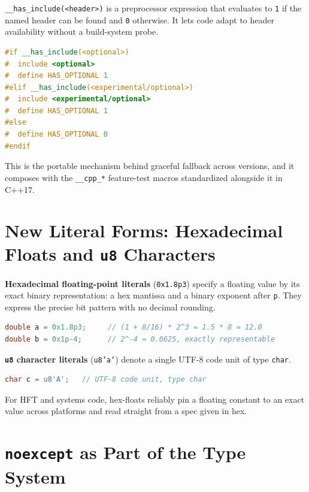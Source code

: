 \texttt{\_\_has\_include(<header>)} is a preprocessor expression that evaluates to \texttt{1} if the named header can be found and \texttt{0} otherwise. It lets code adapt to header availability without a build-system probe.

\begin{lstlisting}[language=C++,caption={Feature-detecting a header at preprocessing time}]
#if __has_include(<optional>)
#  include <optional>
#  define HAS_OPTIONAL 1
#elif __has_include(<experimental/optional>)
#  include <experimental/optional>
#  define HAS_OPTIONAL 1
#else
#  define HAS_OPTIONAL 0
#endif
\end{lstlisting}

This is the portable mechanism behind graceful fallback across versions, and it composes with the \texttt{\_\_cpp\_*} feature-test macros standardized alongside it in C++17.

\section{New Literal Forms: Hexadecimal Floats and \texttt{u8} Characters}
\label{sec:c17-literals}

\textbf{Hexadecimal floating-point literals} (\texttt{0x1.8p3}) specify a floating value by its exact binary representation: a hex mantissa and a binary exponent after \texttt{p}. They express the precise bit pattern with no decimal rounding.

\begin{lstlisting}[language=C++,caption={Hex-float literals express exact binary values}]
double a = 0x1.8p3;     // (1 + 8/16) * 2^3 = 1.5 * 8 = 12.0
double b = 0x1p-4;      // 2^-4 = 0.0625, exactly representable
\end{lstlisting}

\textbf{\texttt{u8} character literals} (\texttt{u8'a'}) denote a single UTF-8 code unit of type \texttt{char}.

\begin{lstlisting}[language=C++,caption={A u8 character literal}]
char c = u8'A';   // UTF-8 code unit, type char
\end{lstlisting}

For HFT and systems code, hex-floats reliably pin a floating constant to an exact value across platforms and read straight from a spec given in hex.

\section{\texttt{noexcept} as Part of the Type System}
\label{sec:c17-noexcept-type}

